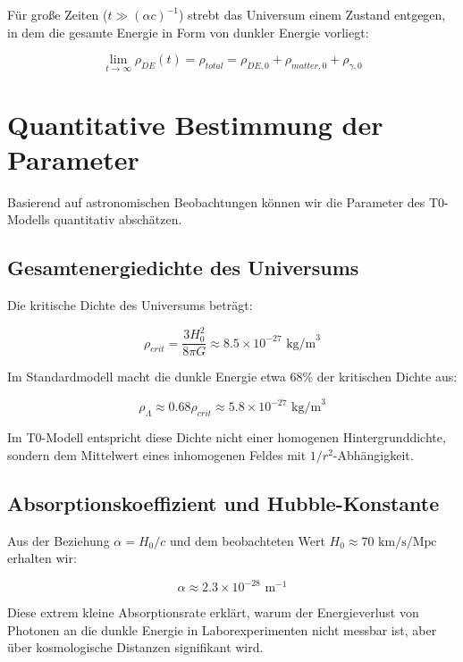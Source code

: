 \documentclass[a4paper,12pt]{article}
\theoremstyle{definition}
\theoremstyle{remark}
\begin{document}
	Für große Zeiten ($t \gg (\alpha c)^{-1}$) strebt das Universum einem Zustand entgegen, in dem die gesamte Energie in Form von dunkler Energie vorliegt:
	
	\begin{equation}
		\lim_{t \rightarrow \infty} \rho_{DE}(t) = \rho_{total} = \rho_{DE,0} + \rho_{matter,0} + \rho_{\gamma,0}
	\end{equation}
	
	\section{Quantitative Bestimmung der Parameter}
	Basierend auf astronomischen Beobachtungen können wir die Parameter des T0-Modells quantitativ abschätzen.
	
	\subsection{Gesamtenergiedichte des Universums}
	Die kritische Dichte des Universums beträgt:
	
	\begin{equation}
		\rho_{crit} = \frac{3H_0^2}{8\pi G} \approx 8.5 \times 10^{-27} \text{ kg/m}^3
	\end{equation}
	
	Im Standardmodell macht die dunkle Energie etwa 68\% der kritischen Dichte aus:
	
	\begin{equation}
		\rho_{\Lambda} \approx 0.68 \rho_{crit} \approx 5.8 \times 10^{-27} \text{ kg/m}^3
	\end{equation}
	
	Im T0-Modell entspricht diese Dichte nicht einer homogenen Hintergrunddichte, sondern dem Mittelwert eines inhomogenen Feldes mit $1/r^2$-Abhängigkeit.
	
	\subsection{Absorptionskoeffizient und Hubble-Konstante}
	Aus der Beziehung $\alpha = H_0/c$ und dem beobachteten Wert $H_0 \approx 70 \text{ km/s/Mpc}$ erhalten wir:
	
	\begin{equation}
		\alpha \approx 2.3 \times 10^{-28} \text{ m}^{-1}
	\end{equation}
	
	Diese extrem kleine Absorptionsrate erklärt, warum der Energieverlust von Photonen an die dunkle Energie in Laborexperimenten nicht messbar ist, aber über kosmologische Distanzen signifikant wird.
	
\end{document}
